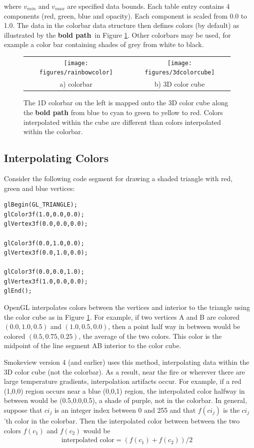 \documentclass[11pt,twoside]{book}
\newcommand{\figoptions}{htp}
\begin{document}
\noindent where $v_{min}$ and $v_{max}$ are specified data bounds.  Each table entry contains 4 components (red, green, blue and opacity).  Each component is scaled from 0.0 to 1.0.  The data in the colorbar data structure then defines colors (by default) as illustrated by the {\bf bold path}\ in Figure \ref{colorbarinfo}.  Other colorbars may be used, for example a color bar containing shades of grey from white to black.


\begin{figure}[\figoptions]
\begin{center}
\begin{tabular}{cc}
\texttt{[image: figures/rainbowcolor]}&\texttt{[image: figures/3dcolorcube]}\\
a) colorbar&b) 3D color cube\\
\end{tabular}
\end{center}
\caption[1D colorbar and 3D color cube]{The 1D colorbar on the left is mapped onto the 3D color cube
along the {\bf bold path} from blue to cyan to green to yellow to red.  Colors interpolated within the cube are different than colors interpolated within the colorbar.}
\label{colorbarinfo}%
\end{figure}

\subsection{Interpolating Colors}

Consider the following code segment for drawing a shaded triangle with red, green and blue vertices:
\begin{verbatim}
glBegin(GL_TRIANGLE);
glColor3f(1.0,0.0,0.0);
glVertex3f(0.0,0.0,0.0);

glColor3f(0.0,1.0,0.0);
glVertex3f(0.0,1.0,0.0);

glColor3f(0.0,0.0,1.0);
glVertex3f(1.0,0.0,0.0);
glEnd();
\end{verbatim}

OpenGL interpolates colors between the vertices and interior to
the triangle using the color cube as in Figure \ref{colorbarinfo}.
For example, if two vertices A and B are colored $(0.0,1.0,0.5)$
and $(1.0,0.5,0.0)$, then a point half way in between would be
colored $(0.5,0.75,0.25)$, the average of the two colors.  This
color is the midpoint of the line segment AB interior to the color
cube.

Smokeview version 4 (and earlier) uses this method, interpolating
data within the 3D color cube (not the colorbar).  As a result,
near the fire or wherever there are large temperature gradients,
interpolation artifacts occur.  For example, if a red (1,0,0)
region occurs near a blue (0,0,1) region, the interpolated color
halfway in between would be (0.5,0.0,0.5), a shade of purple, not
in the colorbar.  In general, suppose that $ci_j$ is an integer
index between 0 and 255 and that $f(ci_j)$ is the $ci_j$'th color
in the colorbar.  Then the interpolated color between between the
two colors $f(c_1)$ and $f(c_2)$ would be
\begin{eqnarray*}
\mbox{interpolated color}=(f(c_1)+f(c_2))/2
\end{eqnarray*}
\end{document}
